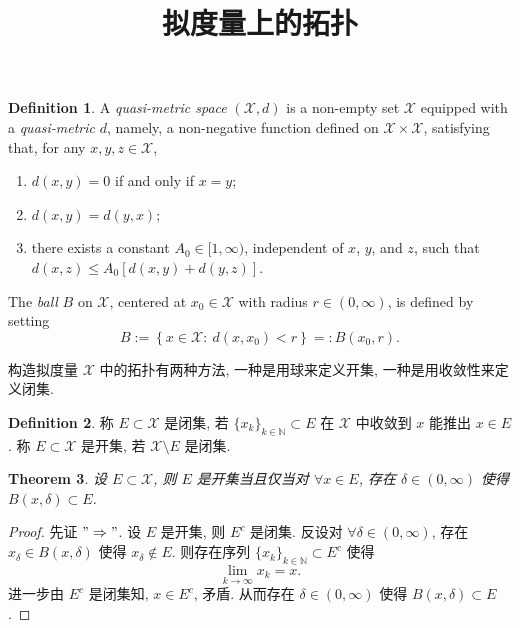 \documentclass[a4paper,11pt]{article}
\title{拟度量上的拓扑}
\newtheorem{theorem}{Theorem}[section]
\theoremstyle{definition}
\newtheorem{definition}[theorem]{Definition}
\begin{document}
\begin{CJK*}{UTF8}{gbsn}

\maketitle

\begin{definition} \label{10.21.1}
A \emph{quasi-metric space} $ (\mathcal{X}, d) $ is a non-empty set $ \mathcal{X} $ equipped with a \emph{quasi-metric} $ d $,
namely, a non-negative function defined on $ \mathcal{X} \times \mathcal{X} $, satisfying that, for any $ x, y, z \in \mathcal{X} $,
    \begin{enumerate}[{\rm(i)}]
        \item $ d(x, y) = 0 $ if and only if $ x = y $;
        \item $ d(x, y) = d(y, x) $;
        \item there exists a constant $ A_0 \in [1, \infty) $, independent of $ x $, $ y $,
            and $ z $, such that $ d(x, z) \leq A_0 [d(x, y) + d(y, z)] $.
    \end{enumerate}
\end{definition}

The \emph{ball} $ B $ on $ \mathcal{X} $, centered at $ x_0 \in \mathcal{X} $ with radius $ r \in (0, \infty) $, 
is defined by setting
$$
    B := \left\{x \in \mathcal{X} :\ d(x, x_0) < r \right\} =: B \left( x_0, r \right).
$$

构造拟度量 $ \mathcal{X} $ 中的拓扑有两种方法, 一种是用球来定义开集, 一种是用收敛性来定义闭集.


\begin{definition} \label{def1}
    称 $ E \subset \mathcal{X} $ 是闭集, 若 $ \{x_k\}_{k \in \mathbb{N}} \subset E $ 在 $ \mathcal{X} $ 中收敛到 $ x $ 
    能推出 $ x \in E $.
    称 $ E \subset \mathcal{X} $ 是开集, 若 $ \mathcal{X} \setminus E $ 是闭集.
\end{definition}

\begin{theorem}
    设 $ E \subset \mathcal{X} $, 则 $ E $ 是开集当且仅当对 $ \forall x \in E $, 
    存在 $ \delta \in (0, \infty) $ 使得 $ B(x, \delta) \subset E $.
\end{theorem}

\begin{proof}
    先证 $ "\Rightarrow" $. 设 $ E $ 是开集, 则 $ E^c $ 是闭集.
    反设对 $ \forall \delta \in (0, \infty) $, 存在 $ x_\delta \in B(x, \delta) $ 使得 $ x_\delta \notin E $. 
    则存在序列 $ \{x_k\}_{k \in \mathbb{N}} \subset E^c $ 使得
    $$
        \lim_{k \to \infty} x_k = x.
    $$
    进一步由 $ E^c $ 是闭集知, $ x \in E^c $, 矛盾. 
    从而存在 $ \delta \in (0, \infty) $ 使得 $ B(x, \delta) \subset E $.
    

\end{proof}
\end{CJK*}
\end{document}
